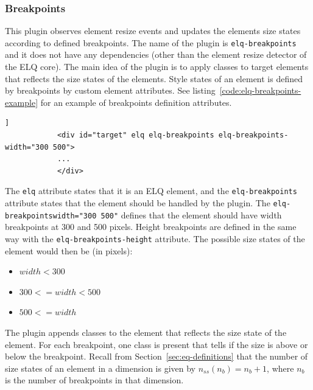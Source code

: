 \documentclass[a4paper,11pt]{kth-mag}
\newcommand{\code}[1]{\texttt{#1}}
\begin{document}
        \subsubsection{Breakpoints}\label{sec:plugin-breakpoints}
          This plugin observes element resize events and updates the elements size states according to defined breakpoints.
          The name of the plugin is \code{elq-breakpoints} and it does not have any dependencies (other than the element resize detector of the \gls{ELQ} core).
          The main idea of the plugin is to apply classes to target elements that reflects the size states of the elements.
          Style states of an element is defined by breakpoints by custom element attributes.
          See listing~\ref{code:elq-breakpoints-example} for an example of breakpoints definition attributes.
          \begin{lstlisting}[gobble=12,caption={Example of an element that has two width breakpoints (300 and 500 pixels) defined by using the \code{elq-breakpoints} plugin.},captionpos=b,label={code:elq-breakpoints-example}]]
            <div id="target" elq elq-breakpoints elq-breakpoints-width="300 500">
            ...
            </div>
          \end{lstlisting}
          The \code{elq} attribute states that it is an \gls{ELQ} element, and the \code{elq-breakpoints} attribute states that the element should be handled by the plugin.
          The \code{elq-breakpoints\-width="300 500"} defines that the element should have width breakpoints at 300 and 500 pixels.
          Height breakpoints are defined in the same way with the \code{elq-breakpoints-height} attribute.
          The possible size states of the element would then be (in pixels):
          \begin{itemize}
            \item $width < 300$
            \item $300 <= width < 500$
            \item $500 <= width$
          \end{itemize}
          The plugin appends classes to the element that reflects the size state of the element.
          For each breakpoint, one class is present that tells if the size is above or below the breakpoint.
          Recall from Section~\ref{sec:eq-definitions} that the number of size states of an element in a dimension is given by $n_{ss}(n_b) = n_b + 1$, where $n_b$ is the number of breakpoints in that dimension.
\end{document}

